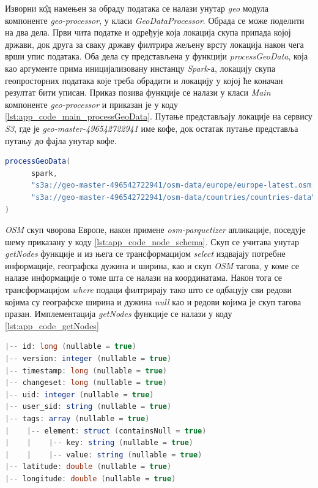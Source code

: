 \documentclass[12pt,oneside]{memoir}
\begin{document}
Изворни к\^{о}д намењен за обраду података се налази унутар \textit{geo} модула компоненте \textit{geo-processor}, у класи \textit{GeoDataProcessor}. Обрада се може поделити на два дела. Први чита податке и одређује која локација скупа припада којој држави, док друга за сваку државу филтрира жељену врсту локација након чега врши упис података. Оба дела су представљена у функцији \textit{processGeoData}, која као аргументе прима иницијализовану инстанцу \textit{Spark}-а, локацију скупа геопросторних података које треба обрадити и локацију у којој ће коначан резултат бити уписан. Приказ позива функције се налази у класи \textit{Main} компоненте \textit{geo-processor} и приказан је у коду \ref{lst:app_code_main_processGeoData}. Путање представљају локације на сервису \textit{S3}, где је \textit{geo-master-496542722941} име кофе, док остатак путање представља путању до фајла унутар кофе.

\begin{lstlisting}[caption={Позивање функције која започиње обраду података}, language=Scala, label={lst:app_code_main_processGeoData}]
processGeoData(
      spark,
      "s3a://geo-master-496542722941/osm-data/europe/europe-latest.osm.pbf.node.parquet",
      "s3a://geo-master-496542722941/osm-data/countries/countries-data"
)
\end{lstlisting}

\textit{OSM} скуп чворова Европе, након примене \textit{osm-parquetizer} апликације, поседује шему приказану у коду \ref{lst:app_code_node_schema}. Скуп се учитава унутар \textit{getNodes} функције и из њега се трансформацијом \textit{select} издвајају потребне информације, географска дужина и ширина, као и скуп \textit{OSM} тагова, у коме се налазе информације о томе шта се налази на координатама. Након тога се трансформацијом \textit{where} подаци филтрирају тако што се одбацују сви редови којима су географске ширина и дужина \textit{null} као и редови којима је скуп тагова празан. Имплементација \textit{getNodes} функције се налази у коду \ref{lst:app_code_getNodes}

\begin{lstlisting}[caption={Шема \textit{OSM} скупа чворова након примене \textit{osm-parquetizer} апликације}, language=Scala, label={lst:app_code_node_schema}]
|-- id: long (nullable = true)
|-- version: integer (nullable = true)
|-- timestamp: long (nullable = true)
|-- changeset: long (nullable = true)
|-- uid: integer (nullable = true)
|-- user_sid: string (nullable = true)
|-- tags: array (nullable = true)
|    |-- element: struct (containsNull = true)
|    |    |-- key: string (nullable = true)
|    |    |-- value: string (nullable = true)
|-- latitude: double (nullable = true)
|-- longitude: double (nullable = true)
\end{lstlisting}
\end{document}
